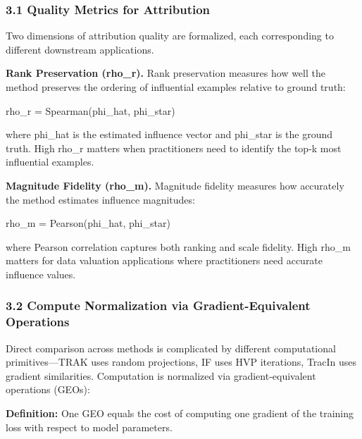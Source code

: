 
\subsubsection{3.1 Quality Metrics for Attribution}

Two dimensions of attribution quality are formalized, each corresponding to different downstream applications.

\textbf{Rank Preservation (rho\_r).} Rank preservation measures how well the method preserves the ordering of influential examples relative to ground truth:

rho\_r = Spearman(phi\_hat, phi\_star)

where phi\_hat is the estimated influence vector and phi\_star is the ground truth. High rho\_r matters when practitioners need to identify the top-k most influential examples.

\textbf{Magnitude Fidelity (rho\_m).} Magnitude fidelity measures how accurately the method estimates influence magnitudes:

rho\_m = Pearson(phi\_hat, phi\_star)

where Pearson correlation captures both ranking and scale fidelity. High rho\_m matters for data valuation applications where practitioners need accurate influence values.

\subsubsection{3.2 Compute Normalization via Gradient-Equivalent Operations}

Direct comparison across methods is complicated by different computational primitives---TRAK uses random projections, IF uses HVP iterations, TracIn uses gradient similarities. Computation is normalized via gradient-equivalent operations (GEOs):

\textbf{Definition:} One GEO equals the cost of computing one gradient of the training loss with respect to model parameters.

\begin{table}[htbp]
\centering
{}
\end{table}

